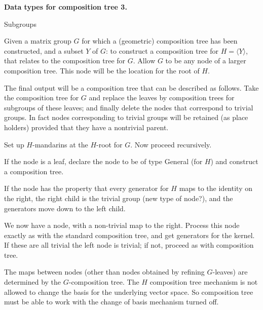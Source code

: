 \def\q{\quad}
\def\GL{{\rm GL}}
\centerline{\bf Data types for composition tree 3.}
\medskip
\centerline{Subgroups}
\medskip
Given a matrix group $G$ for which a (geometric) composition tree has been constructed,
and a subset $Y$ of $G$: to construct a composition tree for $H=\langle Y\rangle$, that
relates to the composition tree for $G$.  Allow $G$ to be any node of a larger composition tree.
This node will be the location for the root of $H$.

The final output will be a composition tree that can be described as follows.  Take the composition
tree for $G$ and replace the leaves by composition trees for subgroups of these leaves; and
finally delete the nodes that correspond to trivial groups.  In fact nodes corresponding to
trivial groups will be retained (as place holders) provided that they have a nontrivial parent.

Set up $H$-mandarins at the $H$-root for $G$.  Now proceed recursively.

If the node is a leaf, declare the node to be of type General (for $H$) and construct a composition
tree.

If the node has the property that every generator for $H$ maps to the identity on the right, the
right child is the trivial group (new type of node?), and the generators move down to
the left child.

We now have a node, with a non-trivial map to the right.  Process this node exactly as with the
standard composition tree, and get generators for the kernel.  If these are all trivial the
left node is trivial; if not, proceed as with composition tree. 

The maps between nodes (other than nodes obtained by refining $G$-leaves) are determined by the
$G$-composition tree.  The $H$ composition tree mechanism is not allowed to change the basis
for the underlying vector space.  So composition tree must be able to work with the change of basis mechanism turned off.
\bye